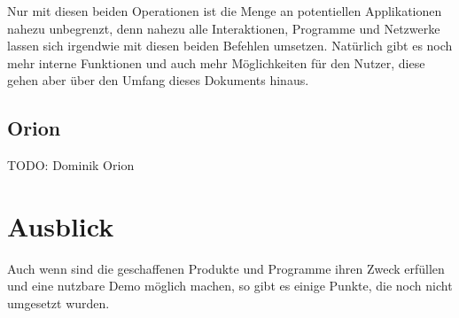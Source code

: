 \documentclass[11pt]{article}
\begin{document}
\noindent Nur mit diesen beiden Operationen ist die Menge an
potentiellen Applikationen nahezu unbegrenzt, denn nahezu alle
Interaktionen, Programme und Netzwerke lassen sich irgendwie mit
diesen beiden Befehlen umsetzen. Natürlich gibt es noch mehr interne
Funktionen und auch mehr Möglichkeiten für den Nutzer, diese gehen
aber über den Umfang dieses Dokuments hinaus.
\subsection{Orion}
\label{sec:org82fe1b1}
TODO: Dominik Orion
\section{Ausblick}
\label{sec:org3bfd7cf}
Auch wenn sind die geschaffenen Produkte und Programme ihren Zweck
erfüllen und eine nutzbare Demo möglich machen, so gibt es einige
Punkte, die noch nicht umgesetzt wurden.
\end{document}
